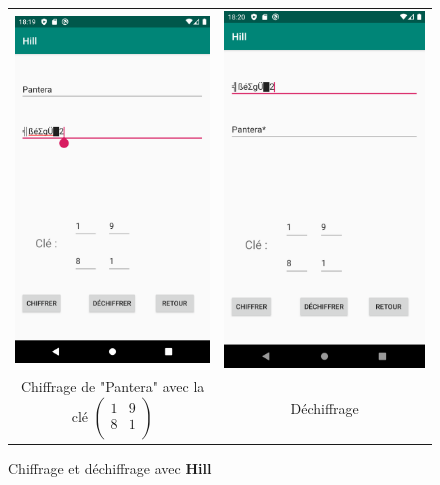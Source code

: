 \documentclass{article}
\begin{document}
\begin{figure}[b!]
    \centering
    \begin{tabular}{cc}
      \includegraphics[width=.35\linewidth]{./img/hill_e.png} &
      \includegraphics[width=.35\linewidth]{./img/hill_d.png} \\
      Chiffrage de "Pantera" avec la clé $\begin{pmatrix}
1&9\\
8&1\\
\end{pmatrix}$ & Déchiffrage\\
    \end{tabular}
    \caption{Chiffrage et déchiffrage avec \textbf{Hill}}\label{fig:hill}
\end{figure}
\end{document}
